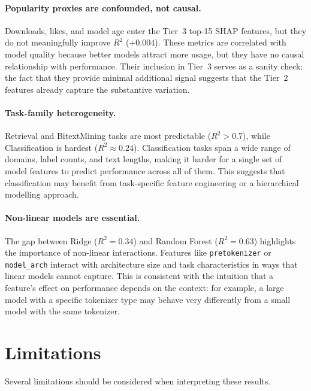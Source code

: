 \documentclass[11pt,a4paper,twocolumn]{article}
\begin{document}
\paragraph{Popularity proxies are confounded, not causal.}
Downloads, likes, and model age enter the Tier~3 top-15 SHAP features, but they do not meaningfully improve $R^2$ ($+0.004$).
These metrics are correlated with model quality because better models attract more usage, but they have no causal relationship with performance.
Their inclusion in Tier~3 serves as a sanity check: the fact that they provide minimal additional signal suggests that the Tier~2 features already capture the substantive variation.

\paragraph{Task-family heterogeneity.}
Retrieval and BitextMining tasks are most predictable ($R^2 > 0.7$), while Classification is hardest ($R^2 \approx 0.24$).
Classification tasks span a wide range of domains, label counts, and text lengths, making it harder for a single set of model features to predict performance across all of them.
This suggests that classification may benefit from task-specific feature engineering or a hierarchical modelling approach.

\paragraph{Non-linear models are essential.}
The gap between Ridge ($R^2 = 0.34$) and Random Forest ($R^2 = 0.63$) highlights the importance of non-linear interactions.
Features like \texttt{pretokenizer} or \texttt{model\_arch} interact with architecture size and task characteristics in ways that linear models cannot capture.
This is consistent with the intuition that a feature's effect on performance depends on the context: for example, a large model with a specific tokenizer type may behave very differently from a small model with the same tokenizer.


\section{Limitations}
\label{sec:limitations}

Several limitations should be considered when interpreting these results.
\end{document}
